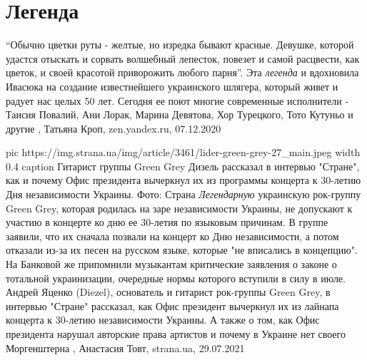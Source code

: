  
 
 
 
 
\chapter{Легенда}
\label{sec:slova.legenda}

\enquote{Обычно цветки руты - желтые, но изредка бывают красные. Девушке,
которой удастся отыскать и сорвать волшебный лепесток, повезет и самой
расцвести, как цветок, и своей красотой приворожить любого парня}.  Эта
\emph{легенда} и вдохновила Ивасюка на создание известнейшего украинского
шлягера, который живет и радует нас целых 50 лет. Сегодня ее поют многие
современные исполнители - Таисия Повалий, Ани Лорак, Марина Девятова, Хор
Турецкого, Тото Кутуньо и другие
, 
Татьяна Кроп, zen.yandex.ru, 07.12.2020

\ifcmt
  pic https://img.strana.ua/img/article/3461/lider-green-grey-27_main.jpeg
  width 0.4
	caption Гитарист группы Green Grey Дизель рассказал в интервью "Стране", как и почему Офис президента вычеркнул их из программы концерта к 30-летию Дня независимости Украины. Фото: Страна 
\fi
\emph{Легендарную} украинскую рок-группу Green Grey, которая родилась на заре
независимости Украины, не допускают к участию в концерте ко дню ее 30-летия по
языковым причинам.  В группе заявили, что их сначала позвали на концерт ко Дню
независимости, а потом отказали из-за их песен на русском языке, которые "не
вписались в концепцию".  На Банковой же припомнили музыкантам критические
заявления о законе о тотальной украинизации, очередные нормы которого вступили
в силу в июле.  Андрей Яценко (Diezel), основатель и гитарист рок-группы Green
Grey, в интервью "Стране" рассказал, как Офис президент вычеркнул их из лайнапа
концерта к 30-летию независимости Украины.  А также о том, как Офис президента
нарушал авторские права артистов и почему в Украине нет своего Моргенштерна
, 
Анастасия Товт, strana.ua, 29.07.2021

